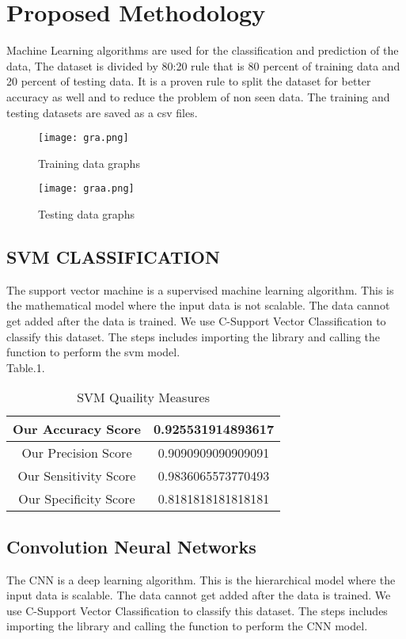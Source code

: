 \documentclass[conference]{IEEEtran}
\begin{document}
\section{Proposed Methodology}
Machine Learning algorithms are used for the classification and prediction of the data, The dataset is divided by 80:20 rule that is 80 percent of training data and 20 percent of testing data. It is a proven rule to split the dataset for better accuracy as well and to reduce the problem of non seen data. The training and testing datasets are saved as a csv files. 

\begin{figure}[h!]
    \centerline{\texttt{[image: gra.png]}}
    \caption{Training data graphs}
\end{figure}
\begin{figure}[h!]
    \centerline{\texttt{[image: graa.png]}}
    \caption{Testing data graphs}
\end{figure}

\subsection{SVM CLASSIFICATION}
The support vector machine is a supervised machine learning algorithm. This is the mathematical model where the input data is not scalable. The data cannot get added after the data is trained. We use C-Support Vector Classification to classify this dataset. The steps includes importing the library and calling the function to perform the svm model.\\

Table.1.\\
\begin{table}[h]
\centering
\begin{tabular}{ | c | c | }
 \hline
 Our Accuracy Score  & 0.925531914893617 \\
 \hline
 Our Precision Score  & 0.9090909090909091 \\
 \hline
 Our Sensitivity Score & 0.9836065573770493 \\
 \hline
 Our Specificity Score & 0.8181818181818181 \\
 \hline
\end{tabular}
\caption{SVM Quaility Measures}
\end{table}

\subsection{Convolution Neural Networks}
The CNN is a deep learning algorithm. This is the hierarchical model where the input data is scalable. The data cannot get added after the data is trained. We use C-Support Vector Classification to classify this dataset. The steps includes importing the library and calling the function to perform the CNN model.
\end{document}
